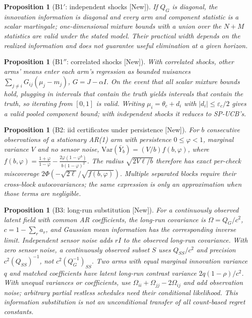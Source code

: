 \documentclass[11pt]{article}
\newtheorem{proposition}[theorem]{Proposition}
\theoremstyle{definition}
\theoremstyle{remark}
\newcommand{\Var}{\mathrm{Var}}
\newcommand{\src}[1]{\textsf{[#1]}}
\begin{document}
\begin{proposition}[B1$'$: independent shocks \src{New}]\label{prop:b1p}
If $Q_G$ is diagonal, the innovation information is diagonal and every arm and component statistic is a scalar martingale; one-dimensional mixture bounds with a union over the $N+M$ statistics are valid under the stated model. Their practical width depends on the realized information and does not guarantee useful elimination at a given horizon.
\end{proposition}

\begin{proposition}[B1$''$: correlated shocks \src{New}]\label{prop:b1pp}
With correlated shocks, other arms' means enter each arm's regression as bounded nuisances $\sum_{j\ne i}G_{ij}(\mu_j-m_j)$, $G=J-\alpha I$. On the event that all scalar mixture bounds hold, plugging in intervals that contain the truth yields intervals that contain the truth, so iterating from $[0,1]$ is valid. Writing $\mu_i=\theta_c+d_i$ with $|d_i|\le\varepsilon_c/2$ gives a valid pooled component bound; with independent shocks it reduces to SP-UCB's.
\end{proposition}

\begin{proposition}[B2: iid certificates under persistence \src{New}]\label{prop:b2}
For $b$ consecutive observations of a stationary AR(1) arm with persistence $0\le\varphi<1$, marginal variance $V$ and no sensor noise, $\Var(\bar Y_b)=(V/b)f(b,\varphi)$, where $f(b,\varphi)=\frac{1+\varphi}{1-\varphi}-\frac{2\varphi(1-\varphi^b)}{b(1-\varphi)^2}$. The radius $\sqrt{2V\ell/b}$ therefore has exact per-check miscoverage $2\Phi(-\sqrt{2\ell}/\sqrt{f(b,\varphi)})$. Multiple separated blocks require their cross-block autocovariances; the same expression is only an approximation when those terms are negligible.
\end{proposition}

\begin{proposition}[B3: long-run substitution \src{New}]\label{prop:b3}
For a continuously observed latent field with common AR coefficients, the long-run covariance is $\Omega=Q_G/c^2$, $c=1-\sum_ra_r$, and Gaussian mean information has the corresponding inverse limit. Independent sensor noise adds $rI$ to the observed long-run covariance. With zero sensor noise, a continuously observed subset $S$ uses $Q_{SS}/c^2$ and precision $c^2(Q_{SS})^{-1}$, not $c^2(Q_G^{-1})_{SS}$. Two arms with equal marginal innovation variance $q$ and matched coefficients have latent long-run contrast variance $2q(1-\rho)/c^2$. With unequal variances or coefficients, use $\Omega_{ii}+\Omega_{jj}-2\Omega_{ij}$ and add observation noise; arbitrary partial restless schedules need their conditional likelihood. This information substitution is not an unconditional transfer of all count-based regret constants.
\end{proposition}
\end{document}
